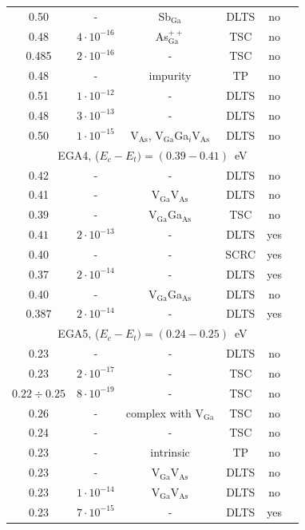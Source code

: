 \documentclass[final,3p,times,twocolumn,authoryear]{elsarticle}
\begin{document}
\begin{table}
\begin{tabular}{cccccc}
0.50&-&Sb$_\mathrm{Ga}$&DLTS&no&\cite{Samoilov1994En}\\ %
0.48&$4\cdot10^{-16}$&As$_\mathrm{Ga}^{++}$&TSC&no&\cite{Pavlovic2000}\\ %
0.485&$2\cdot10^{-16}$&-&TSC&no&\cite{Pavlovic:GaAs}\\ %
0.48&-&impurity&TP&no&\cite{Abele:GaAs}\\ %
0.51&$1\cdot10^{-12}$&-&DLTS&no&\cite{Martin1977}\\ %
0.48&$3\cdot10^{-13}$&-&DLTS&no&\cite{Lang:GaAs}\\ %
0.50&$1\cdot10^{-15}$&V$_\mathrm{As}$, V$_\mathrm{Ga}$Ga$_i$V$_\mathrm{As}$ &DLTS&no&\cite{Pons}\\
\multicolumn{6}{c}{EGA4, ($E_c-E_t)=(0.39-0.41)$~eV}\\
0.42&-&-&DLTS&no&\cite{Neild1991}\\ %
0.41&-&V$_\mathrm{Ga}$V$_\mathrm{As}$&DLTS&no&\cite{Samoilov1994En}\\ %
$0.39$&-&V$_\mathrm{Ga}$Ga$_\mathrm{As}$&TSC&no&\cite{FANG1990}\\ %
$0.41$&$2\cdot10^{-13}$&-&DLTS&yes&\cite{Bourgoin:GaAs}\\ %
0.40&-&-&SCRC&yes&\cite{ASHBY:GaAs}\\ %
0.37&$2\cdot10^{-14}$&-&DLTS&yes&\cite{Fang:EL6}\\ %
0.40&-&V$_\mathrm{Ga}$Ga$_\mathrm{As}$&DLTS&no&\cite{VaitkusEn}\\ %
0.387&$2\cdot10^{-14}$&-&DLTS&yes&\cite{Yousefi1995}\\ %
\multicolumn{6}{c}{EGA5, ($E_c-E_t)=(0.24-0.25)$~eV}\\
0.23&-&-&DLTS&no&\cite{Neild1991}\\ %
0.23&$2\cdot10^{-17}$&-&TSC&no&\cite{Pavlovic2000}\\ %
$0.22\div0.25$&$8\cdot10^{-19}$&-&TSC&no&\cite{Lin:GaAs}\\ %
$0.26$&-&complex with V$_\mathrm{Ga}$&TSC&no&\cite{FANG1990}\\ %
0.24&-&-&TSC&no&\cite{Tomozane:GaAs}\\ %
0.23&-&intrinsic&TP&no&\cite{Abele:GaAs}\\ %
0.23&-&V$_\mathrm{Ga}$V$_\mathrm{As}$&DLTS&no&\cite{Morrow:EL17}\\ %
0.23&$1\cdot10^{-14}$&V$_\mathrm{Ga}$V$_\mathrm{As}$&DLTS&no&\cite{Bourgoin:GaAs}\\ %
0.23&$7\cdot10^{-15}$&-&DLTS&yes&\cite{Mircea1975}\\ %

\end{tabular}
\end{table}
\end{document}
